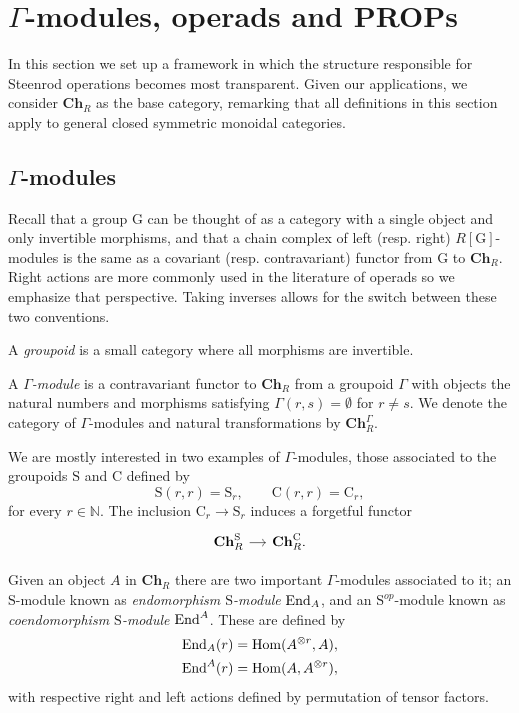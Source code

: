 
\section{$\Gamma$-modules, operads and PROPs}

In this section we set up a framework in which the structure responsible for Steenrod operations becomes most transparent. Given our applications, we consider $\mathbf{Ch}_R$ as the base category, remarking that all definitions in this section apply to general closed symmetric monoidal categories.

\subsection{$\Gamma$-modules}
Recall that a group $\mathrm G$ can be thought of as a category with a single object and only invertible morphisms, and that a chain complex of left (resp. right) $R[\mathrm G]$-modules is the same as a covariant (resp. contravariant) functor from $\mathrm G$ to $\mathbf{Ch}_R$. Right actions are more commonly used in the literature of operads so we emphasize that perspective. Taking inverses allows for the switch between these two conventions. 

A \textit{groupoid} is a small category where all morphisms are invertible.
\begin{definition}
	A \textit{$\Gamma$-module} is a contravariant functor to $\mathbf{Ch}_R$ from a groupoid $\Gamma$ with objects the natural numbers and morphisms satisfying $\Gamma(r,s) = \emptyset$ for $r \neq s$. We denote the category of $\Gamma$-modules and natural transformations by $\mathbf{Ch}_R^\Gamma$.
\end{definition}

We are mostly interested in two examples of $\Gamma$-modules, those associated to the groupoids $\mathrm{S}$ and $\mathrm{C}$ defined by
\begin{equation*}
\mathrm{S}(r, r) = \mathrm{S}_r, \qquad
\mathrm{C}(r,r) = \mathrm{C}_r,
\end{equation*}
for every $r \in \mathbb{N}$. The inclusion $\mathrm{C}_r \to \mathrm{S}_r$ induces a forgetful functor
\begin{equation*}
\begin{tikzcd} [column sep = small]
\mathbf{Ch}_R^\mathrm{S}  \arrow[r] & \mathbf{Ch}_R^\mathrm{C}.
\end{tikzcd}
\end{equation*}

Given an object $A$ in $\mathbf{Ch}_R$ there are two important $\Gamma$-modules associated to it; an $\mathrm{S}$-module known as \textit{endomorphism $\mathrm{S}$-module} $\mathrm{End}_A$, and an $\mathrm{S}^{op}$-module known as \textit{coendomorphism $\mathrm{S}$-module} $\mathrm{End}^A$. These are defined by
\begin{align*}	
\mathrm{End}_A(r) &= \mathrm{Hom}(A^{\otimes r},A), \\
\mathrm{End}^A(r) &= \mathrm{Hom}(A,A^{\otimes r}),
\end{align*}
with respective right and left actions defined by permutation of tensor factors. 

